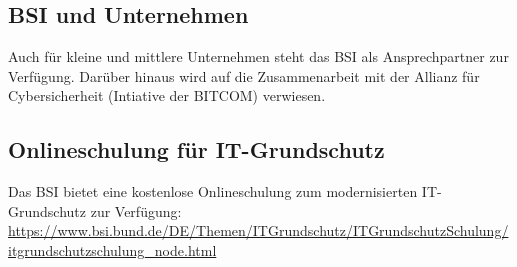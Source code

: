 \subsection{BSI und Unternehmen}

Auch für kleine und mittlere Unternehmen steht das BSI als Ansprechpartner zur Verfügung. Darüber hinaus wird auf die Zusammenarbeit mit der Allianz für Cybersicherheit (Intiative der BITCOM) verwiesen.

\subsection{Onlineschulung für IT-Grundschutz}

Das BSI bietet eine kostenlose Onlineschulung zum modernisierten IT-Grundschutz zur Verfügung: \url{https://www.bsi.bund.de/DE/Themen/ITGrundschutz/ITGrundschutzSchulung/itgrundschutzschulung_node.html}